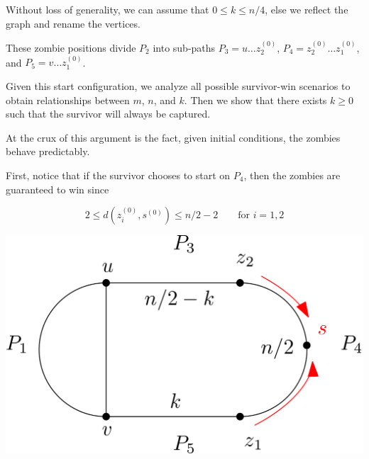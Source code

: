 \documentclass[letterpaper, 10pt]{article}
\begin{document}
\begin{enumerate}
       Without loss of generality, we can assume that $0 \leq k \leq n/4$,
       else we reflect the graph and rename the vertices.

       These zombie positions divide $P_2$ into sub-paths $P_3 = u \dots z_2^{(0)}$,
       $P_4 = z_2^{(0)} \dots z_1^{(0)}$, and
       $P_5 = v \dots z_1^{(0)}$.



       Given this start configuration, we analyze all possible survivor-win scenarios
       to obtain relationships between $m$, $n$, and $k$.
       Then we show that there exists $k \geq 0$ such that the survivor will always be captured.

       At the crux of this argument is the fact, given initial conditions,
       the zombies behave predictably.

       First, notice that if the survivor chooses to start on $P_4$, then the zombies are guaranteed to win
       since

       \[ 2 \leq d(z_i^{(0)}, s^{(0)}) \leq n/2 - 2 \qquad \text{for $i = 1,2$} \]

       \begin{center}
        \includegraphics[scale=0.15]{diagramStartOnP4}
       \end{center}


\end{enumerate}
\end{document}

